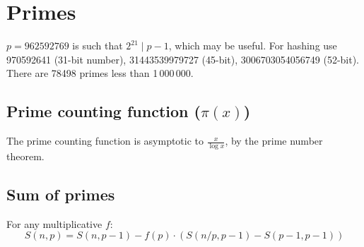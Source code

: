 


\section{Primes}
	$p=962592769$ is such that $2^{21} \mid p-1$, which may be useful. For hashing
	use 970592641 (31-bit number), 31443539979727 (45-bit), 3006703054056749
	(52-bit). There are 78498 primes less than 1\,000\,000.





\subsection{Prime counting function ($\pi(x)$)} The prime counting function is asymptotic to $\frac{x}{\log x}$, by the prime number theorem.
      
\subsection{Sum of primes} For any multiplicative $f$:
                \[ S(n,p) = S(n, p-1) - f(p) \cdot (S(n/p,p-1) - S(p-1,p-1))\]

